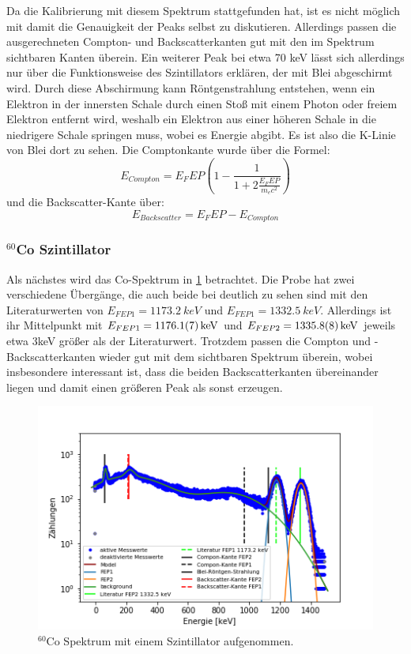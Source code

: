 Da die Kalibrierung mit diesem Spektrum stattgefunden hat, ist es nicht möglich mit  damit die Genauigkeit der Peaks selbst zu diskutieren. Allerdings passen die ausgerechneten Compton- und Backscatterkanten gut mit den im Spektrum sichtbaren Kanten überein. Ein weiterer Peak bei etwa 70 keV lässt sich allerdings nur über die Funktionsweise des Szintillators erklären, der mit Blei abgeschirmt wird. Durch diese Abschirmung kann Röntgenstrahlung entstehen, wenn ein Elektron in der innersten Schale durch einen Stoß mit einem Photon oder freiem Elektron entfernt wird, weshalb ein Elektron aus einer höheren Schale in die niedrigere Schale springen muss, wobei es Energie abgibt. Es ist also die K-Linie von Blei dort zu sehen.
Die Comptonkante wurde über die Formel:
\begin{equation}
	E_{Compton} = E_FEP \left( 1-\frac{1}{1 + 2\frac{E_FEP}{m_ec^2}}\right)
	\label{eq:comptonkante}
\end{equation}
und die Backscatter-Kante über:
\begin{equation}
	E_{Backscatter} = E_FEP - E_{Compton}
\end{equation}


\subsubsection{$^{60}$Co Szintillator}
Als nächstes wird das Co-Spektrum in \cref{co_sz} betrachtet. Die Probe hat zwei verschiedene Übergänge, die auch beide bei deutlich zu sehen sind mit den Literaturwerten von $E_{FEP1} = \SI{1173,2}{keV}$ und $E_{FEP1} = \SI{1332,5}{keV}$. Allerdings ist ihr Mittelpunkt mit $E_{FEP1} = \SI{1176,1 \pm 0,7}{keV}$ und $E_{FEP2} = \SI{1335,8 \pm 0,8}{keV}$ jeweils etwa 3keV größer als der Literaturwert. Trotzdem passen die Compton und - Backscatterkanten wieder gut mit dem sichtbaren Spektrum überein, wobei insbesondere interessant ist, dass die beiden Backscatterkanten übereinander liegen und damit einen größeren Peak als sonst erzeugen.


\begin{figure}[ht]
	\centering
	\includegraphics[scale=0.8]{co_sz_.png}
	\caption{$^{60}$Co Spektrum mit einem Szintillator aufgenommen.}
	\label{co_sz}
\end{figure}

